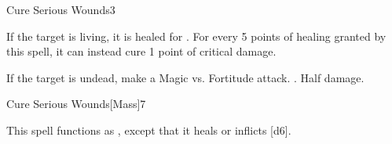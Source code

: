 \begin{spellsection}{Cure Serious Wounds}{3}
\begin{spellheader}
\end{spellheader}
\begin{spellcontent}
    \begin{spelltargetinginfo}
    \end{spelltargetinginfo}
    \begin{spelleffects}
        \spelleffect If the target is living, it is healed for . For every 5 points of healing granted by this spell, it can instead cure 1 point of critical damage.
        \begin{spellattacktriggered}{If the target is undead, make a Magic vs. Fortitude attack.}
            \spellsuccess {}.
            \spellfailure Half damage.
        \end{spellattacktriggered}
    \end{spelleffects}
\end{spellcontent}
\begin{spellfooter}
\end{spellfooter}
\end{spellsection}

\begin{spellsection}{Cure Serious Wounds}[Mass]{7}
\begin{spellheader}
\end{spellheader}
\begin{spellcontent}
    \begin{spelltargetinginfo}
    \end{spelltargetinginfo}
    \begin{spelleffects}
        \spellspecial This spell functions as , except that it heals or inflicts [d6].
    \end{spelleffects}
\end{spellcontent}
\begin{spellfooter}
\end{spellfooter}
\end{spellsection}

